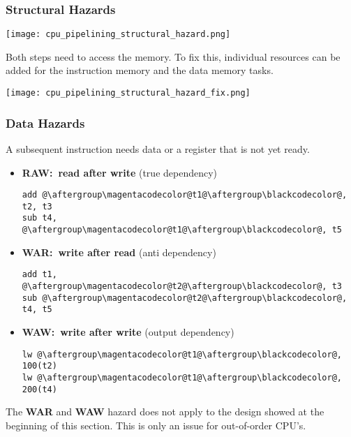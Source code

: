     \subsubsection{Structural Hazards}\label{structural hazards}

    \texttt{[image: cpu\_pipelining\_structural\_hazard.png]}

    Both steps need to access the memory. To fix this, individual resources can be added for the instruction memory and the data memory tasks.

    \begin{center}
        \texttt{[image: cpu\_pipelining\_structural\_hazard\_fix.png]}
    \end{center}

    \subsubsection{Data Hazards}\label{data hazards}

    A subsequent instruction needs data or a register that is not yet ready.

    \begin{itemize}
        \item \textbf{RAW:\ read after write} (true dependency)
              \begin{lstlisting}[escapechar=@]
add @\aftergroup\magentacodecolor@t1@\aftergroup\blackcodecolor@, t2, t3
sub t4, @\aftergroup\magentacodecolor@t1@\aftergroup\blackcodecolor@, t5
\end{lstlisting}
        \item \textbf{WAR:\ write after read} (anti dependency)
              \begin{lstlisting}[escapechar=@]
add t1, @\aftergroup\magentacodecolor@t2@\aftergroup\blackcodecolor@, t3
sub @\aftergroup\magentacodecolor@t2@\aftergroup\blackcodecolor@, t4, t5
\end{lstlisting}
        \item \textbf{WAW:\ write after write} (output dependency)
              \begin{lstlisting}[escapechar=@]
lw @\aftergroup\magentacodecolor@t1@\aftergroup\blackcodecolor@, 100(t2)
lw @\aftergroup\magentacodecolor@t1@\aftergroup\blackcodecolor@, 200(t4)
\end{lstlisting}
    \end{itemize}

    The \textbf{WAR} and \textbf{WAW} hazard does not apply to the design showed at the beginning of this section. This is only an issue for out-of-order CPU's.

